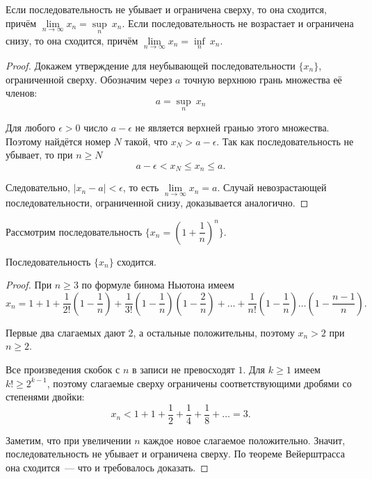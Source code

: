 \begin{theorem}
Если последовательность не убывает и ограничена сверху, то она
сходится, причём \(\lim\limits_{ n \to \infty }{x_{n}} = \underset{n}{\sup} ~ x_{n}\).
Если последовательность не возрастает и ограничена снизу, то
она сходится, причём \(\lim\limits_{ n \to \infty }{x_{n}} = \underset{n}{\inf} ~ x_{n}.\)

\begin{proof}
Докажем утверждение для неубывающей последовательности
\(\{x_{n}\}\), ограниченной сверху. Обозначим через \(a\) точную
верхнюю грань множества её членов:
\[
a = \underset{n}{\sup} ~ x_{n}
\]

Для любого \(\epsilon > 0\) число \(a-\epsilon\) не является
верхней гранью этого множества. Поэтому найдётся номер \(N\) такой,
что \(x_{N} > a - \epsilon\). Так как последовательность не убывает, то при \(n \geq N\)
\[
a - \epsilon < x_{N} \leq x_{n} \leq a.
\]

Следовательно, \(|x_{n} - a|<\epsilon\), то есть \(\lim\limits_{n \to \infty} x_{n} = a\).
Случай невозрастающей последовательности, ограниченной снизу,
доказывается аналогично.
\end{proof}
\end{theorem}


Рассмотрим последовательность
\(\{x_{n}=\left(1 + \dfrac{1}{n}\right)^{n}\}\).

\begin{theorem}
Последовательность \(\{x_{n}\}\) сходится.

\begin{proof}
При \(n \geq 3\) по формуле бинома Ньютона имеем
\[
x_{n} = 1 + 1 + \frac{1}{2!}\left(1 - \frac{1}{n}\right)
+ \frac{1}{3!}\left(1 - \frac{1}{n}\right)
\left(1 - \frac{2}{n}\right) + \dots +
\frac{1}{n!}\left(1 - \frac{1}{n}\right) \dots
\left(1 - \frac{n-1}{n}\right).
\]

Первые два слагаемых дают \(2\), а остальные положительны, поэтому
\(x_{n} > 2\) при \(n \geq 2\).

Все произведения скобок с \(n\) в записи не превосходят \(1\). Для \(k \geq 1\)
имеем \(k! \geq 2^{k-1}\), поэтому слагаемые сверху ограничены
соответствующими дробями со степенями двойки:
\[
x_{n} < 1 + 1 + \frac{1}{2} + \frac{1}{4} + \frac{1}{8} + \dots = 3.
\]

Заметим, что при увеличении \(n\) каждое новое слагаемое положительно.
Значит, последовательность не убывает и ограничена сверху.
По теореме Вейерштрасса она сходится~--- что и требовалось доказать.
\end{proof}
\end{theorem}

